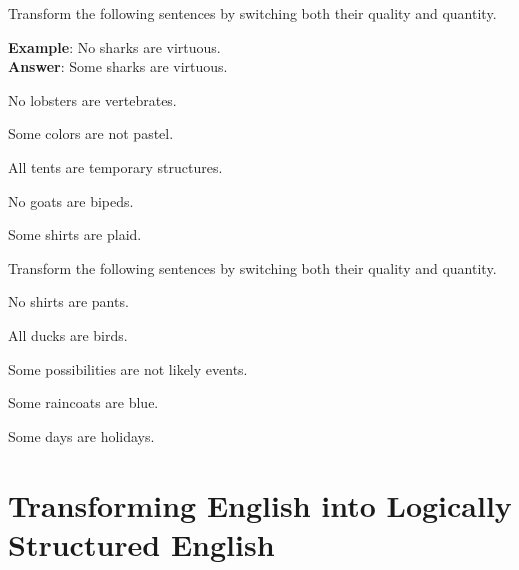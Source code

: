 \noindent\problempart Transform the following sentences by switching both their quality and quantity.

\textbf{Example}: No sharks are virtuous. \\
\textbf{Answer}: Some sharks are virtuous. 

\begin{exercises}
\item No lobsters are vertebrates. 

\item Some colors are not pastel. 

\item All tents are temporary structures.

\item No goats are bipeds. 
 
\item Some shirts are plaid.
\end{exercises}

\noindent\problempart Transform the following sentences by switching both their quality and quantity.

\begin{exercises}
\item No shirts are pants. 
\item All ducks are birds.  
\item Some possibilities are not likely events.
\item Some raincoats are blue. 
\item Some days are holidays. 
\end{exercises}


\section{Transforming English into Logically Structured English} \label{sec:transformation} 

